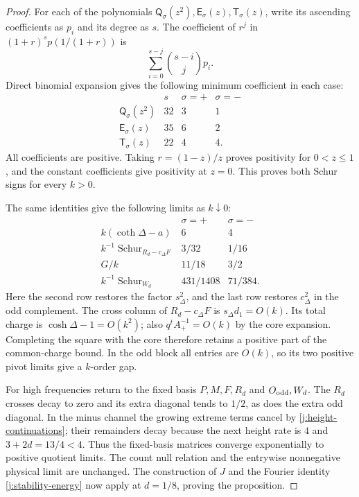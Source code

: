 \begin{proof}
For each of the polynomials
\(\mathsf Q_\sigma(z^2),\mathsf E_\sigma(z),\mathsf T_\sigma(z)\),
write its ascending coefficients as \(p_i\) and its degree as \(s\). The coefficient of \(r^j\) in
\((1+r)^sp(1/(1+r))\) is
\[
\sum_{i=0}^{s-j}\binom{s-i}{j}p_i.
\]
Direct binomial expansion gives the following minimum coefficient in each case:
\[
\begin{array}{c|c|cc}
 &s&\sigma=+&\sigma=-\\\hline
\mathsf Q_\sigma(z^2)&32&3&1\\
\mathsf E_\sigma(z)&35&6&2\\
\mathsf T_\sigma(z)&22&4&4 .
\end{array}
\]
All coefficients are positive. Taking \(r=(1-z)/z\) proves positivity for \(0<z\le1\), and the constant coefficients give positivity at \(z=0\). This proves both Schur signs for every \(k>0\).

The same identities give the following limits as \(k\downarrow0\):
\[
\begin{array}{c|cc}
 &\sigma=+&\sigma=-\\\hline
k(\coth\Delta-a)&6&4\\
k^{-1}\operatorname{Schur}_{R_d-c_\Delta F}&3/32&1/16\\
G/k&11/18&3/2\\
k^{-1}\operatorname{Schur}_{W_d}&431/1408&71/384 .
\end{array}
\]
Here the second row restores the factor \(s_\Delta^2\), and the last row restores \(c_\Delta^2\) in the odd complement. The cross column of \(R_d-c_\Delta F\) is \(s_\Delta d_1=O(k)\). Its total charge is \(\cosh\Delta-1=O(k^2)\); also \(q^tA_+^{-1}=O(k)\) by the core expansion. Completing the square with the core therefore retains a positive part of the common-charge bound. In the odd block all entries are \(O(k)\), so its two positive pivot limits give a \(k\)-order gap.

For high frequencies return to the fixed basis \(P,M,F,R_d\) and \(O_{\rm odd},W_d\). The \(R_d\) crosses decay to zero and its extra diagonal tends to \(1/2\), as does the extra odd diagonal. In the minus channel the growing extreme terms cancel by \eqref{j:height-continuations}; their remainders decay because the next height rate is \(4\) and \(3+2d=13/4<4\). Thus the fixed-basis matrices converge exponentially to positive quotient limits. The count null relation and the entrywise nonnegative physical limit are unchanged. The construction of \(J\) and the Fourier identity \eqref{j:stability-energy} now apply at \(d=1/8\), proving the proposition.
\end{proof}

